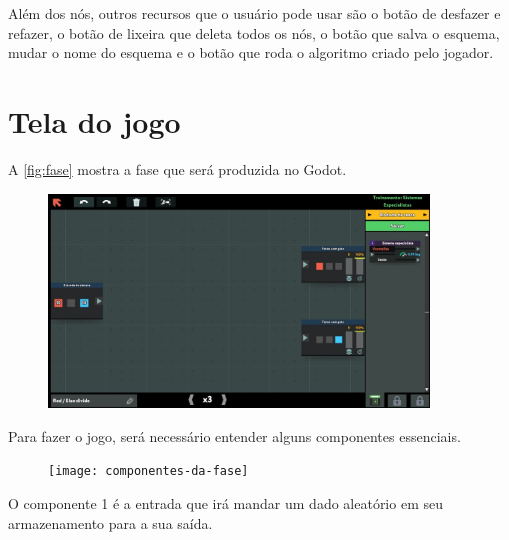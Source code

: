 \documentclass[12pt,oneside,a4paper,chapter=TITLE,section=TITLE,sumario
=tradicional]{abntex2}
\begin{document}
Além dos nós, outros recursos que o usuário pode usar são o botão de desfazer e refazer, o botão de lixeira que deleta todos os nós, o botão que salva o esquema, mudar o nome do esquema e o botão que roda o algoritmo criado pelo jogador.

\chapter{Tela do jogo}
\label{cap:tela-do-jogo}

A \autoref{fig:fase} mostra a fase que será produzida no Godot.

\vspace{1em}

\begin{figure}[!h]
    \centering
    \includegraphics[width=0.9\textwidth]{fase}
\end{figure}

\newpage

Para fazer o jogo, será necessário entender alguns componentes essenciais.

\vspace{1em}

\begin{figure}[!h]
    \centering
    \texttt{[image: componentes-da-fase]}
\end{figure}

\vspace{1em}

O componente 1 é a entrada que irá mandar um dado aleatório em seu armazenamento para a sua saída.
\end{document}
